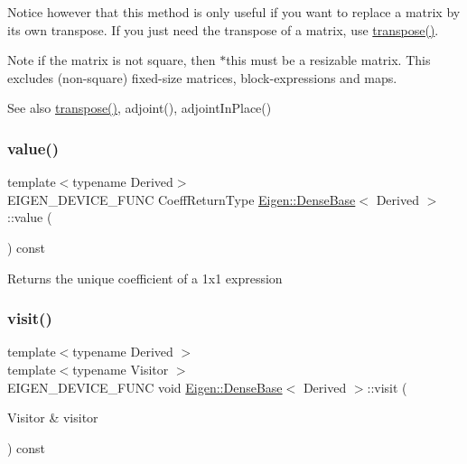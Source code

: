 Notice however that this method is only useful if you want to replace a matrix by its own transpose. If you just need the transpose of a matrix, use \mbox{\hyperlink{class_eigen_1_1_dense_base_ac8952c19644a4ac7e41bea45c19b909c}{transpose()}}.

\begin{DoxyNote}{Note}
if the matrix is not square, then {\ttfamily $\ast$this} must be a resizable matrix. This excludes (non-\/square) fixed-\/size matrices, block-\/expressions and maps.
\end{DoxyNote}
\begin{DoxySeeAlso}{See also}
\mbox{\hyperlink{class_eigen_1_1_dense_base_ac8952c19644a4ac7e41bea45c19b909c}{transpose()}}, adjoint(), adjoint\+In\+Place() 
\end{DoxySeeAlso}
\mbox{\label{class_eigen_1_1_dense_base_a8da735a6bfc7012606acf787156d10a0}} 
\subsubsection{\texorpdfstring{value()}{value()}}
{\footnotesize\ttfamily template$<$typename Derived$>$ \\
E\+I\+G\+E\+N\+\_\+\+D\+E\+V\+I\+C\+E\+\_\+\+F\+U\+NC Coeff\+Return\+Type \mbox{\hyperlink{class_eigen_1_1_dense_base}{Eigen\+::\+Dense\+Base}}$<$ Derived $>$\+::value (\begin{DoxyParamCaption}{ }\end{DoxyParamCaption}) const\hspace{0.3cm}{\ttfamily [inline]}}

\begin{DoxyReturn}{Returns}
the unique coefficient of a 1x1 expression 
\end{DoxyReturn}
\mbox{\label{class_eigen_1_1_dense_base_a7f73df3954a09c7ab0dca208b6b23ddd}} 
\subsubsection{\texorpdfstring{visit()}{visit()}}
{\footnotesize\ttfamily template$<$typename Derived $>$ \\
template$<$typename Visitor $>$ \\
E\+I\+G\+E\+N\+\_\+\+D\+E\+V\+I\+C\+E\+\_\+\+F\+U\+NC void \mbox{\hyperlink{class_eigen_1_1_dense_base}{Eigen\+::\+Dense\+Base}}$<$ Derived $>$\+::visit (\begin{DoxyParamCaption}\item[{Visitor \&}]{visitor }\end{DoxyParamCaption}) const}

